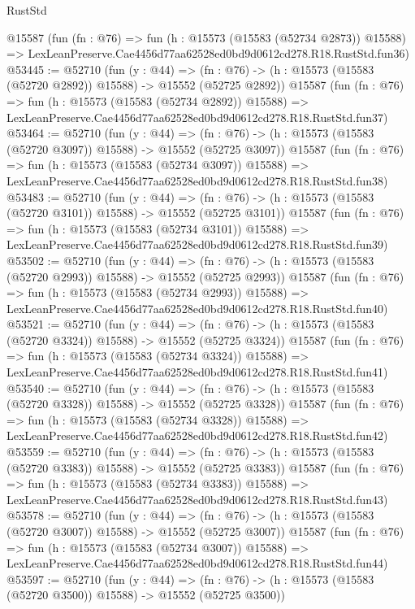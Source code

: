 \begin{lexlean}{RustStd}
\begin{coremodule}
    @15587
    (fun (fn : @76) =>
    fun (h : @15573 (@15583 (@52734 @2873)) @15588) =>
    LexLeanPreserve.Cae4456d77aa62528ed0bd9d0612cd278.R18.RustStd.fun36)
@53445 := @52710
    (fun (y : @44) =>
    (fn : @76) -> (h : @15573 (@15583 (@52720 @2892)) @15588) -> @15552 (@52725 @2892))
    @15587
    (fun (fn : @76) =>
    fun (h : @15573 (@15583 (@52734 @2892)) @15588) =>
    LexLeanPreserve.Cae4456d77aa62528ed0bd9d0612cd278.R18.RustStd.fun37)
@53464 := @52710
    (fun (y : @44) =>
    (fn : @76) -> (h : @15573 (@15583 (@52720 @3097)) @15588) -> @15552 (@52725 @3097))
    @15587
    (fun (fn : @76) =>
    fun (h : @15573 (@15583 (@52734 @3097)) @15588) =>
    LexLeanPreserve.Cae4456d77aa62528ed0bd9d0612cd278.R18.RustStd.fun38)
@53483 := @52710
    (fun (y : @44) =>
    (fn : @76) -> (h : @15573 (@15583 (@52720 @3101)) @15588) -> @15552 (@52725 @3101))
    @15587
    (fun (fn : @76) =>
    fun (h : @15573 (@15583 (@52734 @3101)) @15588) =>
    LexLeanPreserve.Cae4456d77aa62528ed0bd9d0612cd278.R18.RustStd.fun39)
@53502 := @52710
    (fun (y : @44) =>
    (fn : @76) -> (h : @15573 (@15583 (@52720 @2993)) @15588) -> @15552 (@52725 @2993))
    @15587
    (fun (fn : @76) =>
    fun (h : @15573 (@15583 (@52734 @2993)) @15588) =>
    LexLeanPreserve.Cae4456d77aa62528ed0bd9d0612cd278.R18.RustStd.fun40)
@53521 := @52710
    (fun (y : @44) =>
    (fn : @76) -> (h : @15573 (@15583 (@52720 @3324)) @15588) -> @15552 (@52725 @3324))
    @15587
    (fun (fn : @76) =>
    fun (h : @15573 (@15583 (@52734 @3324)) @15588) =>
    LexLeanPreserve.Cae4456d77aa62528ed0bd9d0612cd278.R18.RustStd.fun41)
@53540 := @52710
    (fun (y : @44) =>
    (fn : @76) -> (h : @15573 (@15583 (@52720 @3328)) @15588) -> @15552 (@52725 @3328))
    @15587
    (fun (fn : @76) =>
    fun (h : @15573 (@15583 (@52734 @3328)) @15588) =>
    LexLeanPreserve.Cae4456d77aa62528ed0bd9d0612cd278.R18.RustStd.fun42)
@53559 := @52710
    (fun (y : @44) =>
    (fn : @76) -> (h : @15573 (@15583 (@52720 @3383)) @15588) -> @15552 (@52725 @3383))
    @15587
    (fun (fn : @76) =>
    fun (h : @15573 (@15583 (@52734 @3383)) @15588) =>
    LexLeanPreserve.Cae4456d77aa62528ed0bd9d0612cd278.R18.RustStd.fun43)
@53578 := @52710
    (fun (y : @44) =>
    (fn : @76) -> (h : @15573 (@15583 (@52720 @3007)) @15588) -> @15552 (@52725 @3007))
    @15587
    (fun (fn : @76) =>
    fun (h : @15573 (@15583 (@52734 @3007)) @15588) =>
    LexLeanPreserve.Cae4456d77aa62528ed0bd9d0612cd278.R18.RustStd.fun44)
@53597 := @52710
    (fun (y : @44) =>
    (fn : @76) -> (h : @15573 (@15583 (@52720 @3500)) @15588) -> @15552 (@52725 @3500))

\end{coremodule}
\end{lexlean}

